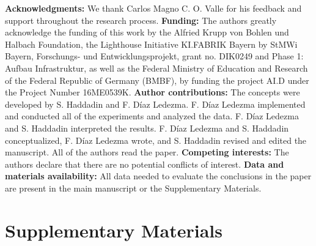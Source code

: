 \documentclass[12pt]{article}
\begin{document}
\textbf{Acknowledgments:}
We thank Carlos Magno C. O. Valle for his feedback and support throughout the research process. \textbf{Funding:} The authors greatly acknowledge the funding of this work by the Alfried Krupp von Bohlen und Halbach Foundation, the Lighthouse Initiative KI.FABRIK Bayern by StMWi Bayern, Forschungs- und Entwicklungsprojekt, grant no. DIK0249 and Phase 1: Aufbau Infrastruktur, as well as the Federal Ministry of Education and Research of the Federal Republic of Germany (BMBF), by funding the project AI.D under the Project Number 16ME0539K. \textbf{Author contributions:} The concepts were developed by S. Haddadin and F. Díaz Ledezma. F. Díaz Ledezma implemented and conducted all of the experiments and analyzed the data. F. Díaz Ledezma and S. Haddadin interpreted the results. F. Díaz Ledezma and S. Haddadin conceptualized, F. Díaz Ledezma wrote, and S. Haddadin revised and edited the manuscript. All of the authors read the paper. \textbf{Competing interests:} The authors declare that there are no potential conflicts of interest. \textbf{Data and materials availability:} All data needed to evaluate the conclusions in the paper are present in the main manuscript or the Supplementary Materials. %

 \newpage
 \beginsupplement
 \section*{Supplementary Materials}\label{sec:supplementary_materials}
 
\end{document}
